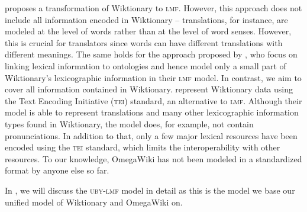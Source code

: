 \documentclass[output=paper]{LSP/langsci}
\begin{document}
\citet{Serasset12} proposes a transformation of Wiktionary to \textsc{lmf}. However, this approach does not include all information encoded in Wiktionary -- translations, for instance, are modeled at the level of words rather than at the level of word senses. However, this is crucial for translators since words can have different translations with different meanings. The same holds for the approach proposed by \citet{McCrae12}, who focus on linking lexical information to ontologies and hence model only a small part of Wiktionary's lexicographic information in their \textsc{lmf} model. In contrast, we aim to cover all information contained in Wiktionary. \citet{DBLP:conf/lrec/DeclerckML12} represent Wiktionary data using the Text Encoding Initiative (\textsc{tei}) standard, an alternative to \textsc{lmf}. Although their model is able to represent translations and many other lexicographic information types found in Wiktionary, the model does, for example, not contain pronunciations. In addition to that, only a few major lexical resources 
have been encoded using the \textsc{tei} standard, which limits the interoperability with other resources. To our knowledge, OmegaWiki has not been modeled in a standardized format by anyone else so far.

In , we will discuss the \textsc{uby-lmf} model \citep{EckleKohler12} in detail as this is the model we base our unified model of Wiktionary and OmegaWiki on.
\end{document}
